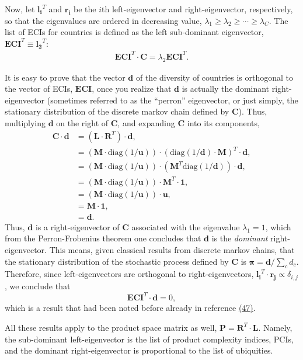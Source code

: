 \documentclass{pnastwo}
\newcommand{\mtx}[1]{\mathbf{ #1}}
\newcommand{\diag}[1]{\mathrm{diag}\left( #1\right)}
\renewcommand{\vec}[1]{\mathbf{#1}}
\begin{document}
\begin{article}
Now, let $\vec{l_i}^T$ and $\vec{r_i}$ be the $i$th left-eigenvector and right-eigenvector, respectively, so that the eigenvalues are ordered in decreasing value, $\lambda_1\geq \lambda_2\geq\cdots\geq \lambda_C$. The list of ECIs for countries is defined as the left sub-dominant eigenvector, $\vec{ECI}^T\equiv \vec{l_2}^T$:
\begin{align}
\vec{ECI}^T\cdot \mtx{C}=\lambda_2 \vec{ECI}^T.
\label{eqn:drag}
\end{align}


It is easy to prove that the vector $\vec{d}$ of the diversity of countries is orthogonal to the vector of ECIs, $\vec{ECI}$, once you realize that $\vec{d}$ is actually the dominant right-eigenvector (sometimes referred to as the ``perron'' eigenvector, or just simply, the stationary distribution of the discrete markov chain defined by $\mtx{C}$). Thus, multiplying $\vec{d}$ on the right of $\mtx{C}$, and expanding $\mtx{C}$ into its components,
\begin{align}
    \mtx{C}\cdot\vec{d} &= (\mtx{L}\cdot\mtx{R}^T)\cdot\vec{d}, \nonumber \\
    &= (\mtx{M}\cdot\diag{1/\vec{u}})\cdot(\diag{1/\vec{d}}\cdot\mtx{M})^T\cdot\vec{d}, \nonumber \\
    &= (\mtx{M}\cdot\diag{1/\vec{u}})\cdot(\mtx{M}^T\diag{1/\vec{d}})\cdot\vec{d}, \nonumber \\
    &= (\mtx{M}\cdot\diag{1/\vec{u}})\cdot\mtx{M}^T\cdot\vec{1}, \nonumber \\
    &= (\mtx{M}\cdot\diag{1/\vec{u}})\cdot\vec{u}, \nonumber \\
    &= \mtx{M}\cdot\vec{1}, \nonumber \\
    &= \vec{d}.
\end{align}
Thus, $\vec{d}$ is a right-eigenvector of $\mtx{C}$ associated with the eigenvalue $\lambda_1=1$, which from the Perron-Frobenius theorem one concludes that $\vec{d}$ is the \emph{dominant} right-eigenvector. This means, given classical results from discrete markov chains, that the stationary distribution of the stochastic process defined by $\mtx{C}$ is ${\boldsymbol \pi} = \vec{d}/\sum_c d_c$. Therefore, since left-eigenvectors are orthogonal to right-eigenvectors, $\vec{l_i}^T \cdot \vec{r_j}\propto\delta_{i,j}$, we conclude that $$\vec{ECI}^T\cdot\vec{d}=0,$$ which is a result that had been noted before already in reference \hyperref[csl:47]{(47)}.

All these results apply to the product space matrix as well, $\mtx{P} = \mtx{R}^T\cdot \mtx{L}$. Namely, the sub-dominant left-eigenvector is the list of product complexity indices, PCIs, and the dominant right-eigenvector is proportional to the list of ubiquities.


\end{article}
\end{document}
